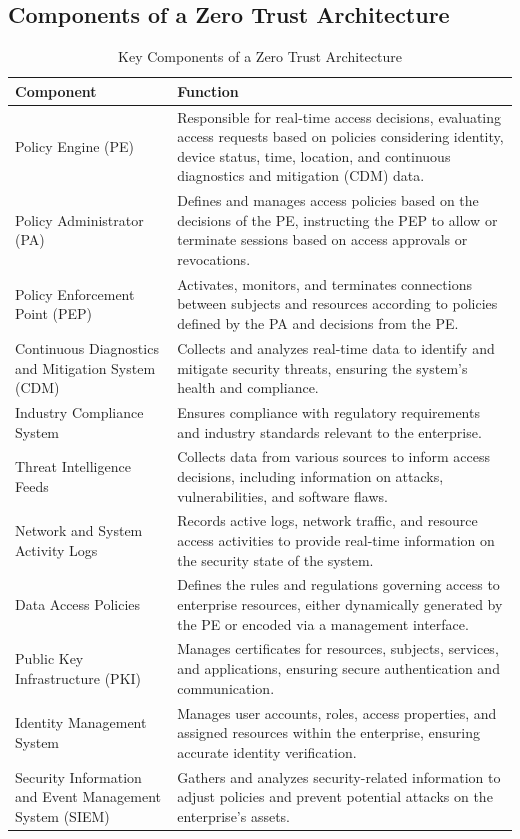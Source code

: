 \documentclass{report}
\begin{document}
\subsection{Components of a Zero Trust Architecture}
\begin{table}[H]

    \begin{tabularx}{\linewidth}{|p{4cm}|X|}
       
    \hline
        \textbf{Component} & \textbf{Function} \\ \hline
        Policy Engine (PE) & Responsible for real-time access decisions, evaluating access requests based on policies considering identity, device status, time, location, and continuous diagnostics and mitigation (CDM) data. \\ \hline
        Policy Administrator (PA) & Defines and manages access policies based on the decisions of the PE, instructing the PEP to allow or terminate sessions based on access approvals or revocations. \\ \hline
        Policy Enforcement Point (PEP) & Activates, monitors, and terminates connections between subjects and resources according to policies defined by the PA and decisions from the PE. \\ \hline
        Continuous Diagnostics and Mitigation System (CDM) & Collects and analyzes real-time data to identify and mitigate security threats, ensuring the system's health and compliance. \\ \hline
        Industry Compliance System & Ensures compliance with regulatory requirements and industry standards relevant to the enterprise. \\ \hline
        Threat Intelligence Feeds & Collects data from various sources to inform access decisions, including information on attacks, vulnerabilities, and software flaws. \\ \hline
        Network and System Activity Logs & Records active logs, network traffic, and resource access activities to provide real-time information on the security state of the system. \\ \hline
        Data Access Policies & Defines the rules and regulations governing access to enterprise resources, either dynamically generated by the PE or encoded via a management interface. \\ \hline
        Public Key Infrastructure (PKI) & Manages certificates for resources, subjects, services, and applications, ensuring secure authentication and communication. \\ \hline
        Identity Management System & Manages user accounts, roles, access properties, and assigned resources within the enterprise, ensuring accurate identity verification. \\ \hline
        Security Information and Event Management System (SIEM) & Gathers and analyzes security-related information to adjust policies and prevent potential attacks on the enterprise's assets. \\ \hline
    \end{tabularx}
    \caption{Key Components of a Zero Trust Architecture}
    \label{tab:componentszta} 
\end{table}
\end{document}
